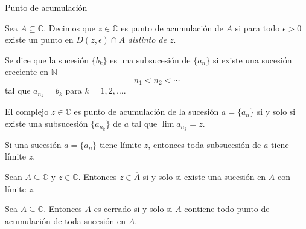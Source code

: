 \documentclass[spanish,presentation]{beamer}
\begin{document}
\begin{frame}[label=sec-3-1]{Punto de acumulación}
\begin{definition}
Sea \(A\subseteq \mathbb{C}\). Decimos que \(z\in \mathbb{C}\) es
\alert{punto de acumulación} de \(A\) si para todo \(\epsilon>0\) existe
un punto en \(D(z,\epsilon)\cap A\) \emph{distinto de \(z\)}.
\end{definition}

\begin{definition}[Subsucesión]
Se dice que la sucesión \(\{b_{k}\}\) es una \alert{subsucesión} de
\(\{a_{n}\}\) si existe una sucesión creciente en \(\mathbb{N}\)
\begin{displaymath}
n_{1}<n_{2}<\cdots
\end{displaymath}
tal que \(a_{n_{k}}=b_{k}\) para \(k=1,2,\ldots\).
\end{definition}
\end{frame}

\begin{frame}[label=sec-3-2]{}
\begin{theorem}
El complejo \(z\in \mathbb{C}\) es punto de acumulación de la
sucesión \(a=\{a_{n}\}\) si y solo si existe una subsucesión
\(\{a_{n_{k}}\}\) de \(a\) tal que \(\lim a_{n_{k}}=z\).
\end{theorem}

\begin{theorem}
Si una sucesión \(a=\{a_{n}\}\) tiene límite \(z\), entonces toda
subsucesión de \(a\) tiene límite \(z\).
\end{theorem}
\end{frame}

\begin{frame}[label=sec-3-3]{}
\begin{theorem}
Sean \(A\subseteq \mathbb{C}\) y \(z\in \mathbb{C}\). Entonces
\(z\in \overline{A}\) si y solo si existe una sucesión en \(A\)
con límite \(z\).
\end{theorem}

\begin{theorem}
Sea \(A\subseteq \mathbb{C}\). Entonces \(A\) es cerrado si y solo
si \(A\) contiene todo punto de acumulación de toda sucesión en
\(A\). 
\end{theorem}
\end{frame}
\end{document}
